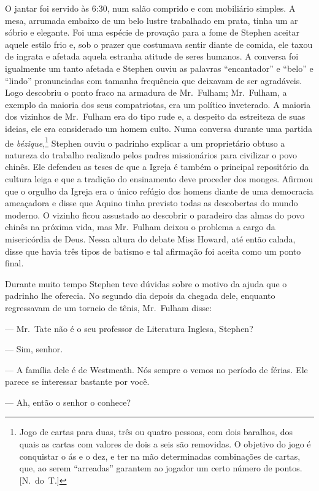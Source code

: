 O jantar foi servido às 6:30, num salão comprido e com mobiliário
simples.  A mesa, arrumada embaixo de um belo lustre trabalhado em
prata, tinha um ar sóbrio e elegante.  Foi uma espécie de provação para
a fome de Stephen aceitar aquele estilo frio e, sob o prazer que
costumava sentir diante de comida, ele taxou de ingrata e afetada
aquela estranha atitude de seres humanos.  A conversa foi igualmente um
tanto afetada e Stephen ouviu as palavras “encantador” e “belo” e
“lindo” pronunciadas com tamanha frequência que deixavam de ser
agradáveis.  Logo descobriu o ponto fraco na armadura de Mr.~Fulham;
Mr.~Fulham, a exemplo da maioria dos seus compatriotas, era um político
inveterado.  A maioria dos vizinhos de Mr.~Fulham era do tipo rude e, a
despeito da estreiteza de suas ideias, ele era considerado um homem
culto.  Numa conversa durante uma partida de
\textit{bézique},\footnote{ Jogo de cartas para duas, três ou quatro
pessoas, com dois baralhos, dos quais as cartas com valores de dois a
seis são removidas. O objetivo do jogo é conquistar o ás e o dez, e ter
na mão determinadas combinações de cartas, que, ao serem “arreadas”
garantem ao jogador um certo número de pontos. [N.~do~T.]}  
Stephen ouviu o padrinho explicar a um proprietário obtuso a natureza
do trabalho realizado pelos padres missionários para civilizar o povo
chinês.  Ele defendeu as teses de que a Igreja é também o principal
repositório da cultura leiga e que a tradição do ensinamento deve
proceder dos monges.  Afirmou que o orgulho da Igreja era o único
refúgio dos homens diante de uma democracia ameaçadora e disse que
Aquino tinha previsto todas as descobertas do mundo moderno.  O vizinho
ficou assustado ao descobrir o paradeiro das almas do povo chinês na
próxima vida, mas Mr.~Fulham deixou o problema a cargo da misericórdia
de Deus.  Nessa altura do debate Miss Howard, até então calada, disse
que havia três tipos de batismo e tal afirmação foi aceita como um
ponto final.

Durante muito tempo Stephen teve dúvidas sobre o motivo da ajuda que
o padrinho lhe oferecia.  No segundo dia depois da chegada dele,
enquanto regressavam de um torneio de tênis, Mr.~Fulham disse:

--- Mr.~Tate não é o seu professor de Literatura Inglesa,
Stephen?

--- Sim, senhor.

--- A família dele é de Westmeath.  Nós sempre o vemos no período
de férias.  Ele parece se interessar bastante por você.

--- Ah, então o senhor o conhece?


